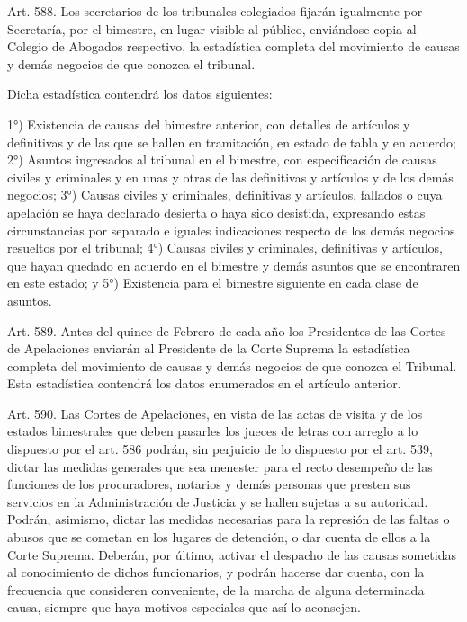     Art. 588. Los secretarios de los tribunales colegiados fijarán igualmente por Secretaría, por el bimestre, en lugar visible al público, enviándose copia al Colegio de Abogados respectivo, la estadística completa del movimiento de causas y demás negocios de que conozca el tribunal.

    Dicha estadística contendrá los datos siguientes:

    1°) Existencia de causas del bimestre anterior, con detalles de artículos y definitivas y de las que se hallen en tramitación, en estado de tabla y en acuerdo;
    2°) Asuntos ingresados al tribunal en el bimestre, con especificación de causas civiles y criminales y en unas y otras de las definitivas y artículos y de los demás negocios;
    3°) Causas civiles y criminales, definitivas y artículos, fallados o cuya apelación se haya declarado desierta o haya sido desistida, expresando estas circunstancias por separado e iguales indicaciones respecto de los demás negocios resueltos por el tribunal;
    4°) Causas civiles y criminales, definitivas y artículos, que hayan quedado en acuerdo en el bimestre y demás asuntos que se encontraren en este estado; y
    5°) Existencia para el bimestre siguiente en cada clase de asuntos.


    Art. 589. Antes del quince de Febrero de cada año los Presidentes de las Cortes de Apelaciones enviarán al Presidente de la Corte Suprema la estadística completa del movimiento de causas y demás negocios de que conozca el Tribunal. Esta estadística contendrá los datos enumerados en el artículo anterior.

    Art. 590. Las Cortes de Apelaciones, en vista de las actas de visita y de los estados bimestrales que deben pasarles los jueces de letras con arreglo a lo dispuesto por el art. 586 podrán, sin perjuicio de lo dispuesto por el art. 539, dictar las medidas generales que sea menester para el recto desempeño de las funciones de los procuradores, notarios y demás personas que presten sus servicios en la Administración de Justicia y se hallen sujetas a su autoridad.
    Podrán, asimismo, dictar las medidas necesarias para la represión de las faltas o abusos que se cometan en los lugares de detención, o dar cuenta de ellos a la Corte Suprema.
    Deberán, por último, activar el despacho de las causas sometidas al conocimiento de dichos funcionarios, y podrán hacerse dar cuenta, con la frecuencia que consideren conveniente, de la marcha de alguna determinada causa, siempre que haya motivos especiales que así lo aconsejen.

